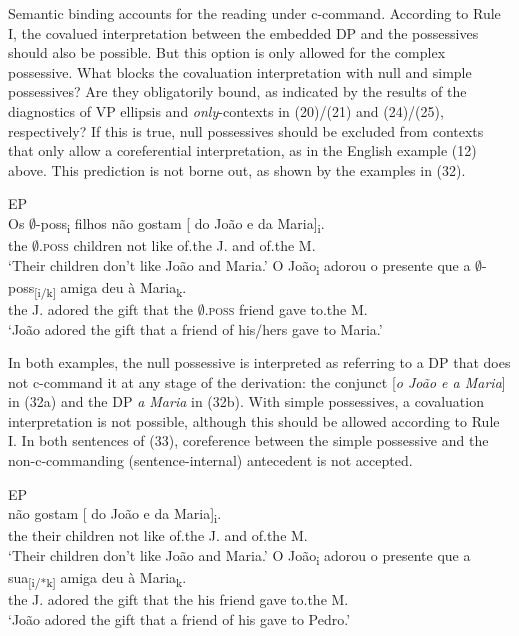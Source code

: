 \documentclass[output=paper]{langsci/langscibook}
\begin{document}
Semantic binding accounts for the reading under c-command. According to Rule I, the covalued interpretation between the embedded DP and the possessives should also be possible. But this option is only allowed for the complex possessive. What blocks the covaluation interpretation with null and simple possessives? Are they obligatorily bound, as indicated by the results of the diagnostics of VP ellipsis and \textit{only}{}-contexts in (20)/(21) and (24)/(25), respectively? If this is true, null possessives should be excluded from contexts that only allow a coreferential interpretation, as in the English example (12) above. This prediction is not borne out, as shown by the examples in (32).

\ea%
         EP\label{ex:wein:32}\\
    \ea  
    \gll Os $\emptyset$-poss\textsubscript{i} filhos não gostam [ do João e da Maria]\textsubscript{i}.\\
         the $\emptyset$\textsc{.poss} children not like {} of.the J. and of.the M.\\
    \glt ‘Their children don’t like João and Maria.’
    \ex 
    \gll O João\textsubscript{i} adorou o presente que a $\emptyset$-poss\textsubscript{[i/k]} amiga deu à Maria\textsubscript{k}.\\
         the J. adored the gift that the $\emptyset$\textsc{.poss} friend gave to.the M.\\
    \glt ‘João adored the gift that a friend of his\slash hers gave to Maria.’
    \z
\z    

In both examples, the null possessive is interpreted as referring to a DP that does not c-command it at any stage of the derivation: the conjunct [\textit{o João e a Maria}] in (32a) and the DP \textit{a Maria} in (32b). With simple possessives, a covaluation interpretation is not possible, although this should be allowed according to Rule I. In both sentences of (33), coreference between the simple possessive and the non-c-commanding (sentence-internal) antecedent is not accepted.

\ea%
         EP\label{ex:wein:33}\\
    \ea  
    \gll {} não gostam [ do João e da Maria]\textsubscript{i}.\\
         {} the their children not like {} of.the J. and of.the M.\\
    \glt ‘Their children don’t like João and Maria.’
    \ex  
    \gll O João\textsubscript{i} adorou o presente que a sua\textsubscript{[i/*k]} amiga deu à Maria\textsubscript{k}.\\
         the J. adored the gift that the his friend gave to.the M.\\
    \glt ‘João adored the gift that a friend of his gave to Pedro.’
    \z
\z
\end{document}
